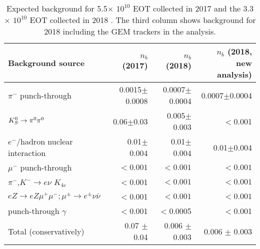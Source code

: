 \begin{table}[bth!]
  \centering
  \caption[Visible mode background]{Expected background for 5.5$\times$ $10^{10}$ EOT collected in 2017 \cite{Banerjee:2018vgk} and the 3.3$\times$ $10^{10}$ EOT collected in 2018 \cite{Banerjee:2019hmi}. The third column shows background for 2018 including the GEM trackers in the analysis.}
  \begin{tabular}{lrrr}
    \hline \hline
    Background source                           & $n_b$ (2017)      &  $n_b$ (2018)   & $n_b$ (2018, new analysis)\\
    \hline
    $\pi^-$ punch-through                        & 0.0015$\pm$0.0008 &  0.0007$\pm$0.0004   & 0.0007$\pm$0.0004   \\    
    $K^0_S \rightarrow \pi^0 \pi^0$                     & 0.06$\pm$0.03    & 0.005$\pm$0.003 &     $<$0.001\\
    $e^-$/hadron nuclear interaction  & 0.01$\pm$0.004    & 0.01$\pm$0.004  & 0.01$\pm$0.004\\    
    $\mu^-$ punch-through                        & $<0.001$ & $<0.001$ & $<0.001$       \\            
    $\pi^-$,$K^- \rightarrow e\nu$ $K_{4e}$              & $<$0.001 & $<0.001$ & $<0.001$\\
    $eZ \rightarrow e Z \mu^+\mu^-;\mu^{\pm}\rightarrow e^{\pm}\nu\bar{\nu}$ & $<$0.001 & $<0.001$ & $<0.001$\\
    punch-through $\gamma$ & $<$0.001 & $<$0.0005 & $<$0.001 \\
    \hline
    Total (conservatively)                      & 0.07 $\pm$ 0.04   & 0.006 $\pm$ 0.003  & 0.006 $\pm$ 0.003\\
    \hline \hline                       
  \end{tabular}
  \label{tab:vis-bkg}
\end{table}

